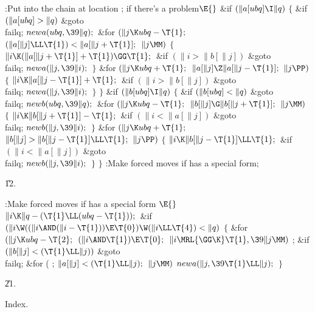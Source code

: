 \Y\B\4:Put  into the chain at location ;  if there's a problem\X${}\E{}$\6
\&{if} ${}(\|a[\\{ubq}]\I\|q){}$\5
${}\{{}$\1\6
\&{if} ${}(\|a[\\{ubq}]>\|q){}$\1\5
\&{goto} \\{failq};\2\6
${}\\{newa}(\\{ubq},\39\|q);{}$\6
\&{for} ${}(\|j\K\\{ubq}-\T{1};{}$ ${}(\|a[\|j]\LL\T{1})<\|a[\|j+\T{1}];{}$ ${}%
\|j\MM){}$\5
${}\{{}$\1\6
${}\|i\K(\|a[\|j+\T{1}]+\T{1})\GG\T{1};{}$\6
\&{if} ${}(\|i>\|b[\|j]){}$\1\5
\&{goto} \\{failq};\2\6
${}\\{newa}(\|j,\39\|i);{}$\6
\4${}\}{}$\2\6
\&{for} ${}(\|j\K\\{ubq}+\T{1};{}$ ${}\|a[\|j]\Z\|a[\|j-\T{1}];{}$ ${}\|j%
\PP){}$\5
${}\{{}$\1\6
${}\|i\K\|a[\|j-\T{1}]+\T{1};{}$\6
\&{if} ${}(\|i>\|b[\|j]){}$\1\5
\&{goto} \\{failq};\2\6
${}\\{newa}(\|j,\39\|i);{}$\6
\4${}\}{}$\2\6
\4${}\}{}$\2\6
\&{if} ${}(\|b[\\{ubq}]\I\|q){}$\5
${}\{{}$\1\6
\&{if} ${}(\|b[\\{ubq}]<\|q){}$\1\5
\&{goto} \\{failq};\2\6
${}\\{newb}(\\{ubq},\39\|q);{}$\6
\&{for} ${}(\|j\K\\{ubq}-\T{1};{}$ ${}\|b[\|j]\G\|b[\|j+\T{1}];{}$ ${}\|j%
\MM){}$\5
${}\{{}$\1\6
${}\|i\K\|b[\|j+\T{1}]-\T{1};{}$\6
\&{if} ${}(\|i<\|a[\|j]){}$\1\5
\&{goto} \\{failq};\2\6
${}\\{newb}(\|j,\39\|i);{}$\6
\4${}\}{}$\2\6
\&{for} ${}(\|j\K\\{ubq}+\T{1};{}$ ${}\|b[\|j]>\|b[\|j-\T{1}]\LL\T{1};{}$ ${}%
\|j\PP){}$\5
${}\{{}$\1\6
${}\|i\K\|b[\|j-\T{1}]\LL\T{1};{}$\6
\&{if} ${}(\|i<\|a[\|j]){}$\1\5
\&{goto} \\{failq};\2\6
${}\\{newb}(\|j,\39\|i);{}$\6
\4${}\}{}$\2\6
\4${}\}{}$\2\6
:Make forced moves if  has a special form\X;\par
\U12.\fi

\B{}:Make forced moves if  has a special form%
\X${}\E{}$\6
$\|i\K\|q-(\T{1}\LL(\\{ubq}-\T{1}));{}$\6
\&{if} ${}(\|i\W((\|i\AND(\|i-\T{1}))\E\T{0})\W(\|i\LL\T{4})<\|q){}$\5
${}\{{}$\1\6
\&{for} ${}(\|j\K\\{ubq}-\T{2};{}$ ${}(\|i\AND\T{1})\E\T{0};{}$ ${}\|i\MRL{{%
\GG}{\K}}\T{1},\39\|j\MM){}$\1\5
;\2\6
\&{if} ${}(\|b[\|j]<(\T{1}\LL\|j)){}$\1\5
\&{goto} \\{failq};\2\6
\&{for} ( ; ${}\|a[\|j]<(\T{1}\LL\|j);{}$ ${}\|j\MM){}$\1\5
${}\\{newa}(\|j,\39\T{1}\LL\|j);{}$\2\6
\4${}\}{}$\2\par
\U21.\fi

Index.
\fi

\inx
\fin
\con
